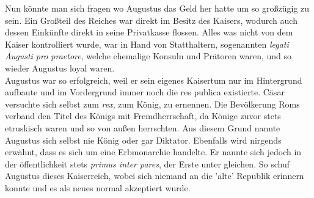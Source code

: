 \documentclass{article}
\begin{document}
	Nun könnte man sich fragen wo Augustus das Geld her hatte um so großzügig zu sein. Ein Großteil des Reiches war direkt im Besitz des Kaisers, wodurch auch dessen Einkünfte direkt in seine Privatkasse flossen. Alles was nicht von dem Kaiser kontrolliert wurde, war in Hand von Statthaltern, sogenannten \textit{legati Augusti pro praetore}, welche ehemalige Konsuln und Prätoren waren, und so wieder Augustus loyal waren.\\
	Augustus war so erfolgreich, weil er sein eigenes Kaisertum nur im Hintergrund aufbaute und im Vordergrund immer noch die res publica existierte. Cäsar versuchte sich selbst zum \textit{rex}, zum König, zu ernennen. Die Bevölkerung Roms verband den Titel des Königs mit Fremdherrschaft, da Könige zuvor stets etruskisch waren und so von außen herrschten. Aus diesem Grund nannte Augustus sich selbst nie König oder gar Diktator. Ebenfalls wird nirgends erwähnt, dass es sich um eine Erbmonarchie handelte. Er nannte sich jedoch in der öffentlichkeit stets \textit{primus inter pares}, der Erste unter gleichen. So schuf Augustus dieses Kaiserreich, wobei sich niemand an die 'alte' Republik erinnern konnte und es als neues normal akzeptiert wurde. \\
\end{document}
